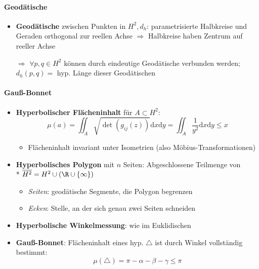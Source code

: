 \paragraph{Geodätische}
\begin{itemize}
  \item \textbf{Geodätische} zwischen Punkten in \( H^2, d_h \): parametrisierte Halbkreise und Geraden orthogonal zur reellen Achse \( \Rightarrow \) Halbkreise haben Zentrum auf reeller Achse
  \item[\( \Rightarrow \)] \( \forall p,q \in H^2 \) können durch eindeutige Geodätische verbunden werden;\@ \( d_h(p,q) = \) hyp. Länge dieser Geodätischen
\end{itemize}

\paragraph{Gauß-Bonnet}
\begin{itemize}
  \item \textbf{Hyperbolischer Flächeninhalt} für \( A \subset H^2 \):
  \begin{equation*}
    \mu(a) = \iint_A \sqrt{\det(g_{ij}(z))}\text{d}x\text{d}y = \iint_A \frac{1}{y^2}\text{d}x\text{d}y \leq x
  \end{equation*}
  \begin{itemize}
    \item Flächeninhalt invariant unter Isometrien (also Möbius-Transformationen)
  \end{itemize}
  \item \textbf{Hyperbolisches Polygon} mit \( n \) Seiten: Abgeschlossene Teilmenge von \\* \( \overline{H^2} = H^2 \cup (\R \cup \left \{ \infty \right \}) \)
  \begin{itemize}
    \item \emph{Seiten}: geodätische Segmente, die Polygon begrenzen
    \item \emph{Ecken}: Stelle, an der sich genau zwei Seiten schneiden
  \end{itemize}
  \item \textbf{Hyperbolische Winkelmessung}: wie im Euklidischen
  \item \textbf{Gauß-Bonnet}: Flächeninhalt eines hyp. \( \triangle \) ist durch Winkel vollständig bestimmt:
  \begin{equation*}
    \mu(\triangle) = \pi - \alpha - \beta - \gamma \leq \pi
  \end{equation*}
\end{itemize}

